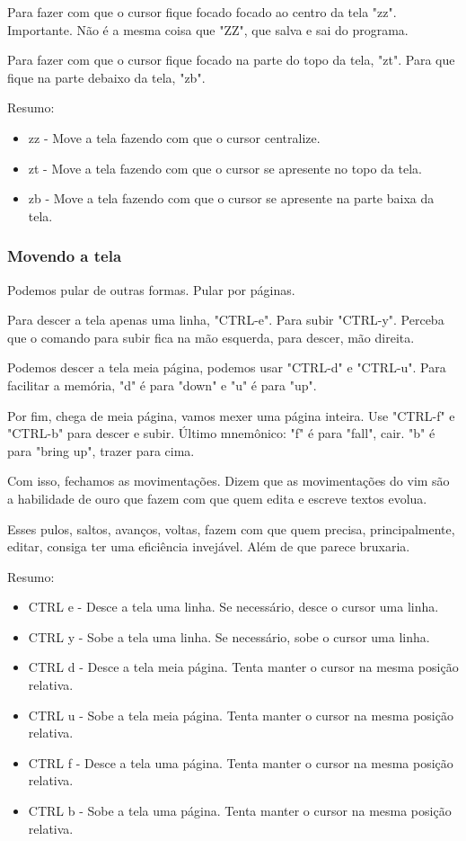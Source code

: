 \documentclass[a4paper, 12pt]{article}
\begin{document}
Para fazer com que o cursor fique focado focado ao centro da tela "zz".
Importante. Não é a mesma coisa que "ZZ", que salva e sai do programa.

Para fazer com que o cursor fique focado na parte do topo da tela, "zt".
Para que fique na parte debaixo da tela, "zb".

Resumo:
\begin{itemize}
    \item zz - Move a tela fazendo com que o cursor centralize. 
    \item zt - Move a tela fazendo com que o cursor se apresente no topo da tela.
    \item zb - Move a tela fazendo com que o cursor se apresente na parte baixa da tela.
\end{itemize}

\subsubsection{Movendo a tela}
Podemos pular de outras formas. Pular por páginas.

Para descer a tela apenas uma linha, "CTRL-e". Para subir "CTRL-y".
Perceba que o comando para subir fica na mão esquerda, para descer, mão direita.

Podemos descer a tela meia página, podemos usar "CTRL-d" e "CTRL-u".
Para facilitar a memória, "d" é para "down" e "u" é para "up".

Por fim, chega de meia página, vamos mexer uma página inteira.
Use "CTRL-f" e "CTRL-b" para descer e subir.
Último mnemônico: "f" é para "fall", cair.
"b" é para "bring up", trazer para cima.

Com isso, fechamos as movimentações.
Dizem que as movimentações do vim são a habilidade de ouro que fazem com que quem edita e escreve textos evolua.

Esses pulos, saltos, avanços, voltas, fazem com que quem precisa, principalmente, editar, consiga ter uma eficiência invejável.
Além de que parece bruxaria.

Resumo:
\begin{itemize}
    \item CTRL e - Desce a tela uma linha. Se necessário, desce o cursor uma linha.
    \item CTRL y - Sobe a tela uma linha. Se necessário, sobe o cursor uma linha.
    \item CTRL d - Desce a tela meia página. Tenta manter o cursor na mesma posição relativa.
    \item CTRL u - Sobe a tela meia página. Tenta manter o cursor na mesma posição relativa.
    \item CTRL f - Desce a tela uma página. Tenta manter o cursor na mesma posição relativa.
    \item CTRL b - Sobe a tela uma página. Tenta manter o cursor na mesma posição relativa.
\end{itemize}
\end{document}
